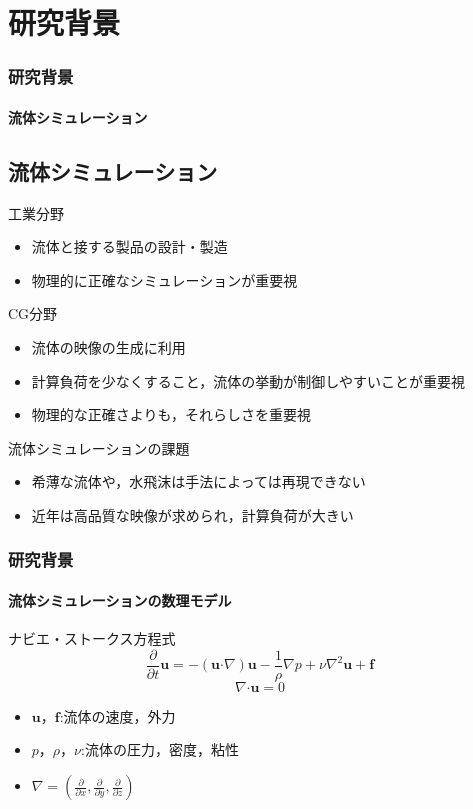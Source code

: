 \documentclass[aspectratio=169,dvipdfmx,hyperref={bookmarks=true}]{beamer}
\begin{document}
   \section{研究背景}
 \begin{frame}
 \frametitle{研究背景}
   \framesubtitle{流体シミュレーション}
 \subsection{流体シミュレーション}
  \begin{block}{工業分野}
  \begin{itemize}
	\item 流体と接する製品の設計・製造
	\item 物理的に正確なシミュレーションが重要視
\end{itemize}
\end{block}
\begin{block}{CG分野}
\begin{itemize}
	\item 流体の映像の生成に利用
	\item 計算負荷を少なくすること，流体の挙動が制御しやすいことが重要視
	\item 物理的な正確さよりも，それらしさを重要視
\end{itemize}
\end{block}

 \begin{block}{流体シミュレーションの課題}
  \begin{itemize}
\item 希薄な流体や，水飛沫は手法によっては再現できない
\item 近年は高品質な映像が求められ，計算負荷が大きい
\end{itemize}
\end{block}
 \end{frame}
  \begin{frame}
  \frametitle{研究背景}
  \framesubtitle{流体シミュレーションの数理モデル}
    \begin{block}{ナビエ・ストークス方程式}
\[
\frac{\partial}{\partial t}\bm{u} = - (\bm{u} \boldsymbol{\cdot}\nabla) \bm{u} - \frac{1}{\rho}\nabla p + \nu\nabla^2\bm{u} + \bm{f}
\]
\[
\nabla\boldsymbol{\cdot}\bm{u} = 0
\]
\begin{itemize}
	\item $\bm{u}$，$\bm{f}$:流体の速度，外力
	\item $p$，$\rho$，$\nu$:流体の圧力，密度，粘性
	\item $\nabla = ( \frac{\partial}{\partial x}, \frac{\partial}{\partial y}, \frac{\partial}{\partial z})$
\end{itemize}
\end{block}
\end{frame}
\end{document}
